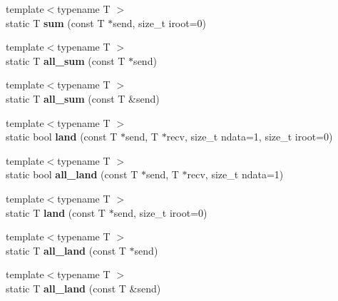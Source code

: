 \begin{DoxyCompactItemize}
\item 
{\footnotesize template$<$typename T $>$ }\\static T {\bfseries sum} (const T $\ast$send, size\+\_\+t iroot=0)\hypertarget{structmpi_ab1104db0bc23a3a22a2bb1180e67d5e1}{}\label{structmpi_ab1104db0bc23a3a22a2bb1180e67d5e1}

\item 
{\footnotesize template$<$typename T $>$ }\\static T {\bfseries all\+\_\+sum} (const T $\ast$send)\hypertarget{structmpi_a46dec749fc45bd597dd9b7dac0e21297}{}\label{structmpi_a46dec749fc45bd597dd9b7dac0e21297}

\item 
{\footnotesize template$<$typename T $>$ }\\static T {\bfseries all\+\_\+sum} (const T \&send)\hypertarget{structmpi_a252bd79e2d5656a2944b3a4bb26ace72}{}\label{structmpi_a252bd79e2d5656a2944b3a4bb26ace72}

\item 
{\footnotesize template$<$typename T $>$ }\\static bool {\bfseries land} (const T $\ast$send, T $\ast$recv, size\+\_\+t ndata=1, size\+\_\+t iroot=0)\hypertarget{structmpi_a720508d9b7b7a39dc2ee4c929e797b7d}{}\label{structmpi_a720508d9b7b7a39dc2ee4c929e797b7d}

\item 
{\footnotesize template$<$typename T $>$ }\\static bool {\bfseries all\+\_\+land} (const T $\ast$send, T $\ast$recv, size\+\_\+t ndata=1)\hypertarget{structmpi_a257e9741e0c2ed81c208fcc3746b3a0a}{}\label{structmpi_a257e9741e0c2ed81c208fcc3746b3a0a}

\item 
{\footnotesize template$<$typename T $>$ }\\static T {\bfseries land} (const T $\ast$send, size\+\_\+t iroot=0)\hypertarget{structmpi_a2fef5dad92aaa848704d2449d2ff336c}{}\label{structmpi_a2fef5dad92aaa848704d2449d2ff336c}

\item 
{\footnotesize template$<$typename T $>$ }\\static T {\bfseries all\+\_\+land} (const T $\ast$send)\hypertarget{structmpi_a617c176abe3125eb814288dc1128694e}{}\label{structmpi_a617c176abe3125eb814288dc1128694e}

\item 
{\footnotesize template$<$typename T $>$ }\\static T {\bfseries all\+\_\+land} (const T \&send)\hypertarget{structmpi_a758ed084bab0d4e5667bb65fbb126279}{}\label{structmpi_a758ed084bab0d4e5667bb65fbb126279}


\end{DoxyCompactItemize}
